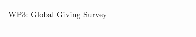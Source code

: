 \begin{longtable}[]{@{}lllllllllll@{}}
\begin{minipage}[t]{0.07\columnwidth}
\begin{quote}
\begin{minipage}[t]{0.07\columnwidth}\raggedright \strut \end{minipage} & \begin{minipage}[t]{0.07\columnwidth}\raggedright \strut \end{minipage}\tabularnewline \begin{minipage}[t]{0.07\columnwidth}\raggedright WP3: Global Giving Survey\strut \end{minipage} & \begin{minipage}[t]{0.07\columnwidth}\raggedright \strut \end{minipage} & \begin{minipage}[t]{0.07\columnwidth}\raggedright \strut \end{minipage} & \begin{minipage}[t]{0.07\columnwidth}\raggedright \strut \end{minipage} & \begin{minipage}[t]{0.07\columnwidth}\raggedright \strut \end{minipage} & \begin{minipage}[t]{0.07\columnwidth}\raggedright \strut \end{minipage} & \begin{minipage}[t]{0.07\columnwidth}\raggedright \strut \end{minipage} & \begin{minipage}[t]{0.07\columnwidth}\raggedright \strut \end{minipage} & \begin{minipage}[t]{0.07\columnwidth}\raggedright \strut \end{minipage} & \begin{minipage}[t]{0.07\columnwidth}\raggedright \strut \end{minipage} & \begin{minipage}[t]{0.07\columnwidth}\raggedright \strut \end{minipage}\tabularnewline \begin{minipage}[t]{0.07\columnwidth}\raggedright \begin{quote}

\end{quote}
\end{minipage}
\end{longtable}
